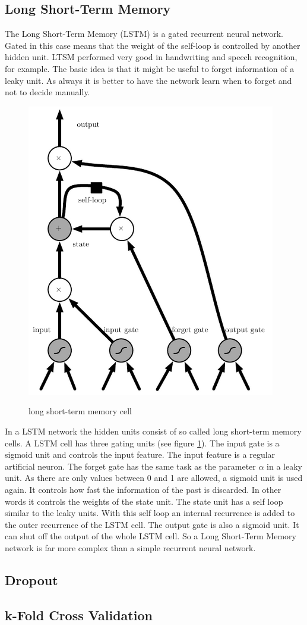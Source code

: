 \subsection{Long Short-Term Memory}
\label{sec:lstm}
The Long Short-Term Memory (LSTM) is a gated recurrent neural network. Gated in this case means that the weight of the self-loop is controlled by another hidden unit. LTSM performed very good in handwriting and speech recognition, for example. The basic idea is that it might be useful to forget information of a leaky unit. As always it is better to have the network learn when to forget and not to decide manually.\\
\label{sec:lstm}
\begin{figure}[thb]
	\caption{long short-term memory cell \cite[p. 405]{DeepLearning}}
	\includegraphics[width=0.95\linewidth]{images/lstmCell.PNG}
	\label{fig:lstm}
\end{figure}
In a LSTM network the hidden units consist of so called long short-term memory cells. A LSTM cell has three gating units (see figure \ref{fig:lstm}). The input gate is a sigmoid unit and controls the input feature. The input feature is a regular artificial neuron. The forget gate has the same task as the parameter $\alpha$ in a leaky unit. As there are only values between 0 and 1 are allowed, a sigmoid unit is used again. It controls how fast the information of the past is discarded. In other words it controls the weights of the state unit. The state unit has a self loop similar to the leaky units. With this self loop an internal recurrence is added to the outer recurrence of the LSTM cell. The output gate is also a sigmoid unit. It can shut off the output of the whole LSTM cell. So a Long Short-Term Memory network is far more complex than a simple recurrent neural network.

\subsection{Dropout}
\label{sec:dropout}

\subsection{k-Fold Cross Validation}
\label{sec:fcv}
